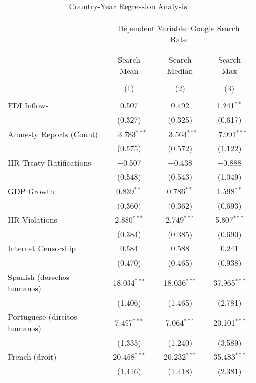 
\begin{table}[!htbp] \centering 
  \caption{Country-Year Regression Analysis} 
  \label{} 
\begin{tabular}{@{\extracolsep{5pt}}lccc} 
\\[-1.8ex]\hline 
\hline \\[-1.8ex] 
 & \multicolumn{3}{c}{Dependent Variable: Google Search Rate} \\ 
\cline{2-4} 
\\[-1.8ex] & \multicolumn{3}{c}{ } \\ 
 & Search Mean & Search Median & Search Max \\ 
\\[-1.8ex] & (1) & (2) & (3)\\ 
\hline \\[-1.8ex] 
 FDI Inflows & 0.507 & 0.492 & 1.241$^{**}$ \\ 
  & (0.327) & (0.325) & (0.617) \\ 
  Amnesty Reports (Count) & $-$3.783$^{***}$ & $-$3.564$^{***}$ & $-$7.991$^{***}$ \\ 
  & (0.575) & (0.572) & (1.122) \\ 
  HR Treaty Ratifications & $-$0.507 & $-$0.438 & $-$0.888 \\ 
  & (0.548) & (0.543) & (1.049) \\ 
  GDP Growth & 0.839$^{**}$ & 0.786$^{**}$ & 1.598$^{**}$ \\ 
  & (0.360) & (0.362) & (0.693) \\ 
  HR Violations & 2.880$^{***}$ & 2.749$^{***}$ & 5.807$^{***}$ \\ 
  & (0.384) & (0.385) & (0.690) \\ 
  Internet Censorship & 0.584 & 0.588 & 0.241 \\ 
  & (0.470) & (0.465) & (0.938) \\ 
  Spanish (derechos humanos) & 18.034$^{***}$ & 18.036$^{***}$ & 37.965$^{***}$ \\ 
  & (1.406) & (1.465) & (2.781) \\ 
  Portuguese (direitos humanos) & 7.497$^{***}$ & 7.064$^{***}$ & 20.101$^{***}$ \\ 
  & (1.335) & (1.240) & (3.589) \\ 
  French (droit) & 20.468$^{***}$ & 20.232$^{***}$ & 35.483$^{***}$ \\ 
  & (1.416) & (1.418) & (2.381) \\ 

\end{tabular}
\end{table}
